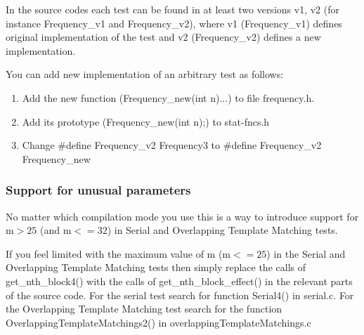 \documentclass[12pt]{article}
\begin{document}
\smallskip
In the source codes each test can be found in at least two versions v1, v2 (for instance Frequency\_v1 and Frequency\_v2), where v1 (Frequency\_v1) defines original implementation of the test and v2 (Frequency\_v2) defines a new implementation. 

\newpage
You can add new implementation of an arbitrary test as follows:
\begin{enumerate}
\setlength\itemsep{-3pt}
\item Add the new function (Frequency\_new(int n){...}) to file frequency.h.
\item Add its prototype (Frequency\_new(int n);) to stat-fncs.h
\item Change \#define Frequency\_v2 Frequency3 to \#define Frequency\_v2 Frequency\_new
\end{enumerate}

\subsubsection*{Support for unusual parameters}
No matter which compilation mode you use this is a way to introduce support for m$>25$ (and m$<=32$) in Serial and Overlapping Template Matching tests.

\medskip
If you feel limited with the maximum value of m (m$<=25$) in the Serial and Overlapping Template Matching tests then simply replace the calls of get\_nth\_block4() with the calls of get\_nth\_block\_effect() in the relevant parts of the source code. For the serial test search for function Serial4() in serial.c. For the Overlapping Template Matching test search for the function OverlappingTemplateMatchings2() in overlappingTemplateMatchings.c
\end{document}
